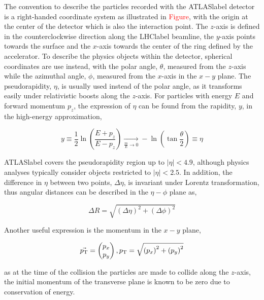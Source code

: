 The convention to describe the particles recorded with the \acrshort{ATLASlabel} detector is a right-handed coordinate system as illustrated in \textcolor{red}{Figure}, with the origin at the center of the detector which is also the interaction point. The $z$-axis is defined in the counterclockwise direction along the \acrshort{LHClabel} beamline, the $y$-axis points towards the surface and the $x$-axis towards the center of the ring defined by the accelerator. To describe the physics objects within the detector, spherical coordinates are use instead, with the polar angle, $\theta$, measured from the $z$-axis while the azimuthal angle, $\phi$, measured from the $x$-axis in the $x-y$ plane. The pseudorapidity, $\eta$, is usually used instead of the polar angle, as it transforms easily under relativistic boosts along the $z$-axis. For particles with energy $E$ and forward momentum $p_z$, the expression of $\eta$ can be found from the rapidity, $y$, in the high-energy approximation,

\begin{equation}
   y \equiv \frac{1}{2}\ln\left(\frac{E+p_z}{E-p_z}\right) \xrightarrow[ \frac{m}{E} \to 0]{} -\ln\left(\tan\frac{\theta}{2}\right)\equiv \eta
\end{equation}

\acrshort{ATLASlabel} covers the pseudorapidity region up to $|\eta|<4.9$, although physics analyses
typically consider objects restricted to $|\eta|<2.5$. In addition, the difference in $\eta$ between two points, $\Delta\eta$, is invariant under Lorentz transformation, thus angular distances can be described in the $\eta-\phi$ plane as,

\begin{equation}
    \Delta R = \sqrt{\left(\Delta\eta\right)^2+\left(\Delta\phi\right)^2}
\end{equation}

Another useful expression is the momentum in the $x-y$ plane, 

\begin{equation}
    \vec{p_{\text{T}}} = \begin{pmatrix} p_x \\ p_y \end{pmatrix}, p_{\text{T}} = \sqrt{\left(p_x\right)^2+\left(p_y\right)^2}
\end{equation}

as at the time of the collision the particles are made to collide along the $z$-axis, the initial momentum of the transverse plane is known to be zero due to conservation of energy.

